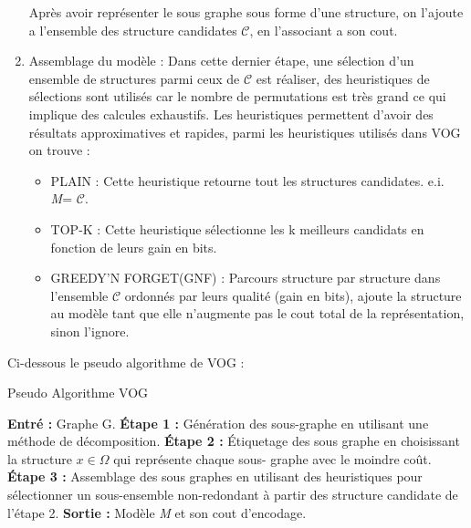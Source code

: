 \begin{enumerate}
Après avoir représenter le sous graphe sous forme d'une structure, on l'ajoute a l'ensemble des structure candidates $\mathcal{C}$, en l'associant a son cout.

\item Assemblage du modèle : Dans cette dernier étape, une sélection d'un ensemble de structures parmi ceux de $\mathcal{C}$ est réaliser,  des heuristiques de sélections sont utilisés car le nombre de permutations est très grand ce qui implique des calcules exhaustifs. Les heuristiques permettent d'avoir des résultats approximatives et rapides, parmi les heuristiques utilisés dans VOG on trouve :
\begin{itemize}
\item PLAIN : Cette heuristique retourne tout les structures candidates. e.i. \textit{M}= $\mathcal{C}$.
\item TOP-K :  Cette heuristique sélectionne les k meilleurs candidats en fonction de leurs gain en bits.
\item GREEDY'N FORGET(GNF) : Parcours structure par structure dans l'ensemble $\mathcal{C}$ ordonnés par leurs qualité (gain en bits), ajoute la structure au modèle tant que elle n'augmente pas le cout total de la représentation, sinon l'ignore.%
\end{itemize}  
\end{enumerate}


Ci-dessous le pseudo algorithme de VOG :\\

\begin{algorithm}
\caption{Pseudo Algorithme VOG}\label{euclid}
\begin{algorithmic}[1]
\State \textbf{Entré :} Graphe G.
\State \textbf{Étape 1 :}  Génération des sous-graphe en utilisant une méthode de décomposition.  
\State \textbf{Étape 2 :} Étiquetage des sous graphe en choisissant la structure $x \in \Omega$ qui représente chaque sous- graphe avec le moindre coût.
\State \textbf{Étape 3 :} Assemblage des sous graphes en utilisant des heuristiques pour sélectionner un sous-ensemble non-redondant à partir des structure candidate de l'étape 2.
\State \textbf{Sortie :} Modèle \textit{M} et son cout d'encodage.
\end{algorithmic}
\end{algorithm}




